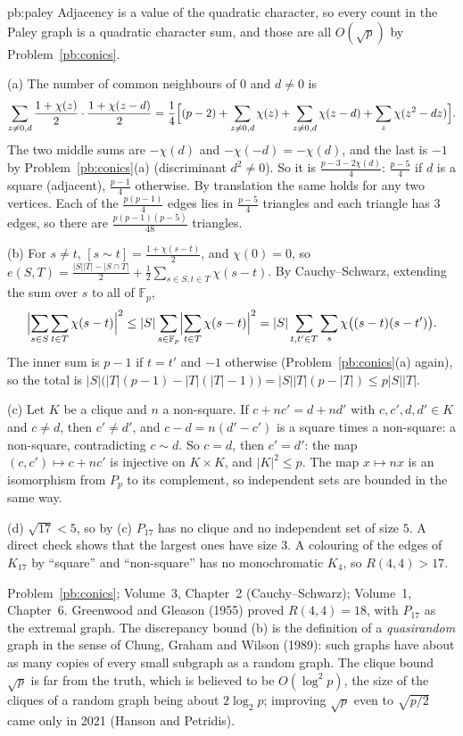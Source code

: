 \begin{solution}{pb:paley}
\idea Adjacency is a value of the quadratic character, so every count in the Paley graph is a quadratic character sum, and those
are all $O(\sqrt p)$ by Problem~\ref{pb:conics}.

\writeup (a) The number of common neighbours of $0$ and $d\ne0$ is
\[
\sum_{z\ne0,d}\frac{1+\chi(z)}2\cdot\frac{1+\chi(z-d)}2=\frac14\Bigl[(p-2)+\sum_{z\ne0,d}\chi(z)+\sum_{z\ne0,d}\chi(z-d)+\sum_z\chi(z^2-dz)\Bigr].
\]
The two middle sums are $-\chi(d)$ and $-\chi(-d)=-\chi(d)$, and the last is $-1$ by Problem~\ref{pb:conics}(a) (discriminant $d^2\ne0$).
So it is $\frac{p-3-2\chi(d)}4$: $\frac{p-5}4$ if $d$ is a square (adjacent), $\frac{p-1}4$ otherwise. By translation the same holds for
any two vertices. Each of the $\frac{p(p-1)}4$ edges lies in $\frac{p-5}4$ triangles and each triangle has $3$ edges, so there are
$\frac{p(p-1)(p-5)}{48}$ triangles.

(b) For $s\ne t$, $[s\sim t]=\frac{1+\chi(s-t)}2$, and $\chi(0)=0$, so
$e(S,T)=\frac{|S||T|-|S\cap T|}2+\frac12\sum_{s\in S,t\in T}\chi(s-t)$. By Cauchy--Schwarz, extending the sum over $s$ to all of
$\mathbb F_p$,
\[
\Bigl|\sum_{s\in S}\sum_{t\in T}\chi(s-t)\Bigr|^2\le|S|\sum_{s\in\mathbb F_p}\Bigl|\sum_{t\in T}\chi(s-t)\Bigr|^2
=|S|\sum_{t,t'\in T}\sum_s\chi\bigl((s-t)(s-t')\bigr).
\]
The inner sum is $p-1$ if $t=t'$ and $-1$ otherwise (Problem~\ref{pb:conics}(a) again), so the total is
$|S|\bigl(|T|(p-1)-|T|(|T|-1)\bigr)=|S||T|(p-|T|)\le p|S||T|$.

(c) Let $K$ be a clique and $n$ a non-square. If $c+nc'=d+nd'$ with $c,c',d,d'\in K$ and $c\ne d$, then $c'\ne d'$, and
$c-d=n(d'-c')$ is a square times a non-square: a non-square, contradicting $c\sim d$. So $c=d$, then $c'=d'$: the map
$(c,c')\mapsto c+nc'$ is injective on $K\times K$, and $|K|^2\le p$. The map $x\mapsto nx$ is an isomorphism from $P_p$ to its
complement, so independent sets are bounded in the same way.

(d) $\sqrt{17}<5$, so by (c) $P_{17}$ has no clique and no independent set of size $5$. A direct check
shows that the largest ones have size $3$. A colouring of the edges of $K_{17}$ by ``square'' and
``non-square'' has no monochromatic $K_4$, so $R(4,4)>17$.

\tools Problem~\ref{pb:conics}; Volume~3, Chapter~2 (Cauchy--Schwarz); Volume~1, Chapter~6.
\leads Greenwood and Gleason (1955) proved $R(4,4)=18$, with $P_{17}$ as the extremal graph. The discrepancy bound (b) is the
definition of a \emph{quasirandom} graph in the sense of Chung, Graham and Wilson (1989): such graphs have about as many copies of
every small subgraph as a random graph. The clique bound $\sqrt p$ is far from the truth, which is believed to be $O(\log^2p)$,
the size of the cliques of a random graph being about $2\log_2p$; improving $\sqrt p$ even to $\sqrt{p/2}$ came only in 2021
(Hanson and Petridis).
\end{solution}

